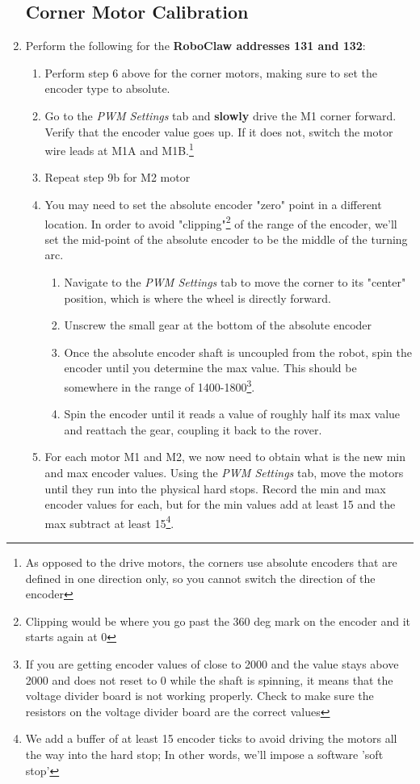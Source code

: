 \documentclass[12pt]{article}
\begin{document}
\begin{enumerate}
\subsection{Corner Motor Calibration}
	\item Perform the following for the \textbf{RoboClaw addresses 131 and 132}:
	\begin{enumerate}
		\item Perform step 6 above for the corner motors, making sure to set the encoder type to absolute. 
		\item Go to the \textit{PWM Settings} tab and \textbf{slowly} drive the M1 corner forward. Verify that the encoder value goes up. If it does not, switch the motor wire leads at M1A and M1B.\footnote{As opposed to the drive motors, the corners use absolute encoders that are defined in one direction only, so you cannot switch the direction of the encoder}
		\item Repeat step 9b for M2 motor
		\item You may need to set the absolute encoder "zero" point in a different location. In order to avoid "clipping"\footnote{Clipping would be where you go past the 360 deg mark on the encoder and it starts again at 0} of the range of the encoder, we'll set the mid-point of the absolute encoder to be the middle of the turning arc. 
		\begin{enumerate} 
			\item Navigate to the \textit{PWM Settings} tab to move the corner to its "center" position, which is where the wheel is directly forward. 
			\item Unscrew the small gear at the bottom of the absolute encoder
			\item Once the absolute encoder shaft is uncoupled from the robot, spin the encoder until you determine the max value. This should be somewhere in the range of 1400-1800\footnote{If you are getting encoder values of close to 2000 and the value stays above 2000 and does not reset to 0 while the shaft is spinning, it means that the voltage divider board is not working properly. Check to make sure the resistors on the voltage divider board are the correct values}.
			\item Spin the encoder until it reads a value of roughly half its max value and reattach the gear, coupling it back to the rover. 
		\end{enumerate}
		
		\item For each motor M1 and M2, we now need to obtain what is the new min and max encoder values. Using the \textit{PWM Settings} tab, move the motors until they run into the physical hard stops. Record the min and max encoder values for each, but for the min values add at least 15 and the max subtract at least 15\footnote{We add a buffer of at least 15 encoder ticks to avoid driving the motors all the way into the hard stop; In other words, we'll impose a software 'soft stop'}.
		

\end{enumerate}
\end{enumerate}
\end{document}
